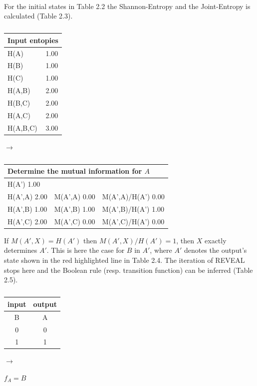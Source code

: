 \\
For the initial states in Table 2.2 the Shannon-Entropy and the Joint-Entropy is calculated (Table 2.3). 

\begin{table}[H]
\parbox{.30\linewidth}{
\centering
\begin{tabular}{lc}
\multicolumn{2}{l}{\textbf{Input entopies}}\\
\hline
H(A) & 1.00 \\
H(B) & 1.00 \\
H(C) & 1.00 \\
H(A,B) & 2.00 \\
H(B,C) & 2.00 \\
H(A,C) & 2.00 \\
H(A,B,C) & 3.00
\end{tabular}
\caption{}
}
\hfill
$\rightarrow$
\hfill
\parbox{.65\linewidth}{
\centering
\begin{tabular}{|l|l|l|l|l|l|}
\multicolumn{6}{|l|}{\textbf{Determine the mutual information for $A$}} \\\hline
\multicolumn{6}{|l|}{H(A')  1.00} \\ \hline 
\multicolumn{2}{|l|}{H(A',A)  2.00} & \multicolumn{2}{l|}{M(A',A)  0.00} & \multicolumn{2}{l|}{M(A',A)/H(A')  0.00} \\ \hline
\multicolumn{2}{|l|}{H(A',B)  1.00} & \multicolumn{2}{l|}{M(A',B)  1.00} & \multicolumn{2}{l|}{\color{red}M(A',B)/H(A')  1.00} \\ \hline
\multicolumn{2}{|l|}{H(A',C)  2.00} & \multicolumn{2}{l|}{M(A',C)  0.00} & \multicolumn{2}{l|}{M(A',C)/H(A')  0.00}\\ \hline
\end{tabular}
\caption{}
}
\end{table}

If $M(A',X)=H(A')$ then $M(A',X)/H(A')=1$, then $X$ exactly determines $A'$. This is here the case for $B$ in $A'$, where $A'$ denotes the output's state shown in the red highlighted line in Table 2.4. The iteration of REVEAL stops here and the Boolean rule (resp. transition function) can be inferred (Table 2.5). \\

\begin{table}[H]
\parbox{.30\linewidth}{
\centering
\begin{tabular}{c|c}
input & output \\ 
\hline
B & A \\ 
\hline
0 & 0 \\
1 & 1 \\
\end{tabular}
\caption{}}
\hfill
$\rightarrow$
\hfill
\parbox{.30\linewidth}{
\centering
$f_{A}= B$}
\end{table}

